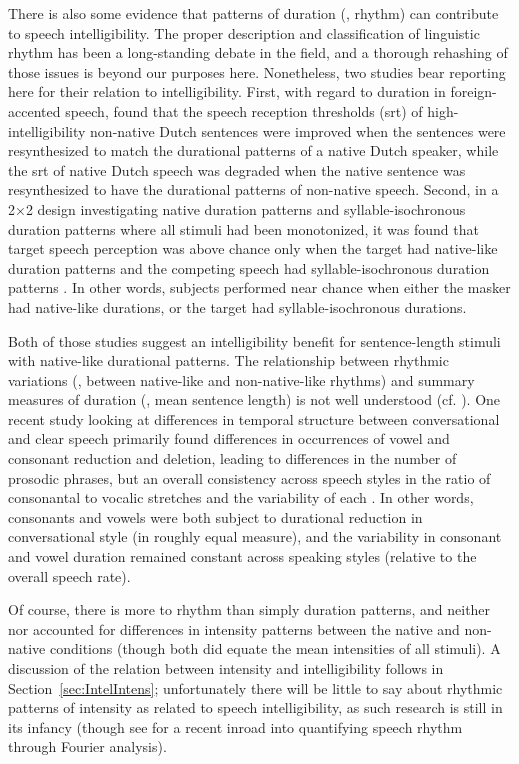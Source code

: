 There is also some evidence that patterns of duration (\ie, rhythm) can contribute to speech intelligibility.  The proper description and classification of linguistic rhythm has been a long-standing debate in the field, and a thorough rehashing of those issues is beyond our purposes here.\footnotemark{}  Nonetheless, two studies bear reporting here for their relation to intelligibility.  First, with regard to duration in foreign-accented speech, \citet{QueneVanDelft2010} found that the speech reception thresholds (\ac{srt}) of high-intelligibility non-native Dutch sentences were improved when the sentences were resynthesized to match the durational patterns of a native Dutch speaker, while the \ac{srt} of native Dutch speech was degraded when the native sentence was resynthesized to have the durational patterns of non-native speech.  Second, in a 2×2 design investigating native duration patterns and syllable-isochronous duration patterns where all stimuli had been monotonized, it was found that target speech perception was above chance only when the target had native-like duration patterns and the competing speech had syllable-isochronous duration patterns \citep{CushingDellwo2010}.  In other words, subjects performed near chance when either the masker had native-like durations, or the target had syllable-isochronous durations.  

Both of those studies suggest an intelligibility benefit for sentence-length stimuli with native-like durational patterns.  The relationship between rhythmic variations (\eg, between native-like and non-native-like rhythms) and summary measures of duration (\eg, mean sentence length) is not well understood (cf. \citealt{Ramus2002}).  One recent study looking at differences in temporal structure between conversational and clear speech primarily found differences in occurrences of vowel and consonant reduction and deletion, leading to differences in the number of prosodic phrases, but an overall consistency across speech styles in the ratio of consonantal to vocalic stretches and the variability of each \citep{SmiljanicBradlow2008}.  In other words, consonants and vowels were both subject to durational reduction in conversational style (in roughly equal measure), and the variability in consonant and vowel duration remained constant across speaking styles (relative to the overall speech rate).

Of course, there is more to rhythm than simply duration patterns, and neither \citet{QueneVanDelft2010} nor \citet{CushingDellwo2010} accounted for differences in intensity patterns between the native and non-native conditions (though both did equate the mean intensities of all stimuli).  A discussion of the relation between intensity and intelligibility follows in Section~\ref{sec:IntelIntens}; unfortunately there will be little to say about rhythmic patterns of intensity as related to speech intelligibility, as such research is still in its infancy (though see \citealt{TilsenJohnson2008} for a recent inroad into quantifying speech rhythm through Fourier analysis).

